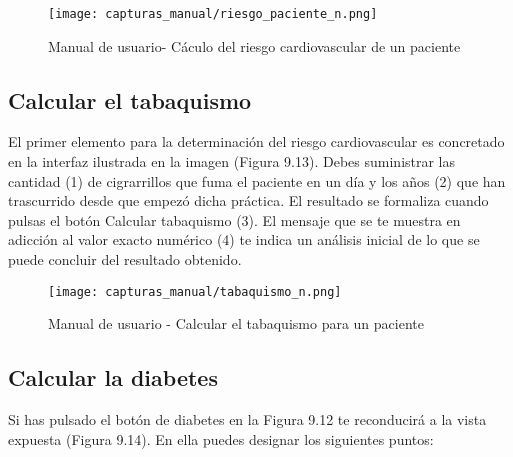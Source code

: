 \documentclass[11pt,spanish,
		listoftables,listoffigures]
		{tfgplantilla}
\begin{document}
\begin{figure}[H]
\centering
\texttt{[image: capturas\_manual/riesgo\_paciente\_n.png]}
\caption{Manual de usuario- Cáculo del riesgo cardiovascular de un paciente}
\end{figure}

\newpage
\subsection {Calcular el tabaquismo}

El primer elemento para la determinación del riesgo cardiovascular es concretado en la interfaz ilustrada en la imagen (Figura 9.13). Debes suministrar las cantidad (1) de cigrarrillos que fuma el paciente en un día y los años (2) que han trascurrido desde que empezó dicha práctica. El resultado se formaliza cuando pulsas el botón \textquotedbl Calcular tabaquismo\textquotedbl{} (3). El mensaje que se te muestra en adicción al valor exacto numérico (4) te indica un análisis inicial de lo que se puede concluir del resultado obtenido.

\begin{figure}[H]
\centering
\texttt{[image: capturas\_manual/tabaquismo\_n.png]}
\caption{Manual de usuario - Calcular el tabaquismo para un paciente}
\end{figure}

\newpage
\subsection {Calcular la diabetes}

Si has pulsado el botón de diabetes en la Figura 9.12 te reconducirá a la vista expuesta (Figura 9.14). En ella puedes designar los siguientes puntos:
\end{document}
